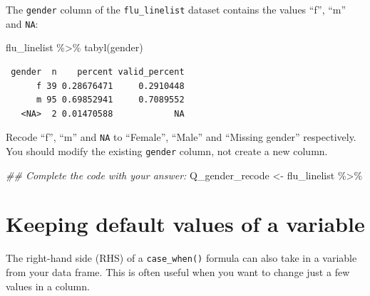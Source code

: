 \documentclass[
  letterpaper,
  DIV=11,
  numbers=noendperiod]{scrreprt}
\newenvironment{Shaded}{\begin{snugshade}}{\end{snugshade}}
\newcommand{\DocumentationTok}[1]{\textcolor[rgb]{0.37,0.37,0.37}{\textit{#1}}}
\newcommand{\FunctionTok}[1]{\textcolor[rgb]{0.28,0.35,0.67}{#1}}
\newcommand{\NormalTok}[1]{\textcolor[rgb]{0.00,0.23,0.31}{#1}}
\newcommand{\OtherTok}[1]{\textcolor[rgb]{0.00,0.23,0.31}{#1}}
\newcommand{\SpecialCharTok}[1]{\textcolor[rgb]{0.37,0.37,0.37}{#1}}
\begin{document}
\begin{tcolorbox}[enhanced jigsaw, colframe=quarto-callout-tip-color-frame, rightrule=.15mm, opacityback=0, breakable, coltitle=black, colbacktitle=quarto-callout-tip-color!10!white, bottomrule=.15mm, leftrule=.75mm, toprule=.15mm, arc=.35mm, bottomtitle=1mm, colback=white, left=2mm, opacitybacktitle=0.6, titlerule=0mm, title=\textcolor{quarto-callout-tip-color}{\faLightbulb}\hspace{0.5em}{Practice}, toptitle=1mm]

The \texttt{gender} column of the \texttt{flu\_linelist} dataset
contains the values ``f'', ``m'' and \texttt{NA}:

\begin{Shaded}
\begin{Highlighting}[]
\NormalTok{flu\_linelist }\SpecialCharTok{\%\textgreater{}\%} 
  \FunctionTok{tabyl}\NormalTok{(gender)}
\end{Highlighting}
\end{Shaded}

\begin{verbatim}
 gender  n    percent valid_percent
      f 39 0.28676471     0.2910448
      m 95 0.69852941     0.7089552
   <NA>  2 0.01470588            NA
\end{verbatim}

Recode ``f'', ``m'' and \texttt{NA} to ``Female'', ``Male'' and
``Missing gender'' respectively. You should modify the existing
\texttt{gender} column, not create a new column.

\begin{Shaded}
\begin{Highlighting}[]
\DocumentationTok{\#\# Complete the code with your answer:}
\NormalTok{Q\_gender\_recode }\OtherTok{\textless{}{-}} 
\NormalTok{  flu\_linelist }\SpecialCharTok{\%\textgreater{}\%} 
\end{Highlighting}
\end{Shaded}

\end{tcolorbox}

\hypertarget{keeping-default-values-of-a-variable}{%
\section{Keeping default values of a
variable}\label{keeping-default-values-of-a-variable}}

The right-hand side (RHS) of a \texttt{case\_when()} formula can also
take in a variable from your data frame. This is often useful when you
want to change just a few values in a column.
\end{document}
